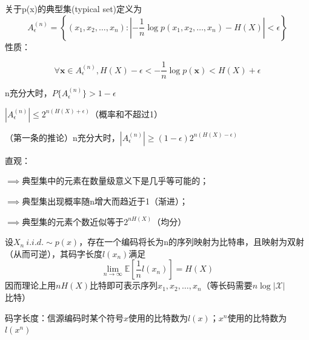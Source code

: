 \documentclass{ctexbook}
\begin{document}
\begin{definition}[典型集]
    关于p(x)的典型集(typical set)定义为
    \[A_{\epsilon}^{(n)} = \left\{(x_1,x_2,\ldots,x_n):\left|-\frac{1}{n} \log p(x_1,x_2,\ldots,x_n) - H(X)\right| < \epsilon\right\}\]
    性质：
    
     $$\forall \mathbf{x}\in A_{\epsilon}^{(n)},H(X)-\epsilon < -\frac{1}{n} \log p(\mathbf{x}) < H(X)+\epsilon$$

     n充分大时，$P\{A_{\epsilon}^{(n)}\} > 1-\epsilon$

     $|A_{\epsilon}^{(n)}| \leq 2^{n(H(X)+\epsilon)}$（概率和不超过1）

     （第一条的推论）n充分大时，$|A_{\epsilon}^{(n)}| \geq (1-\epsilon)2^{n(H(X)-\epsilon)}$
\end{definition}
\begin{remark}
    直观：

    $\implies$典型集中的元素在数量级意义下是几乎等可能的；

    $\implies$典型集出现概率随n增大而趋近于1（渐进）；

    $\implies$典型集的元素个数近似等于$2^{nH(X)}$（均分）
\end{remark}

设$X_n\ i.i.d.\sim p(x)$，存在一个编码将长为n的序列映射为比特串，且映射为双射（从而可逆），其码字长度$l(x_n)$满足
\[\lim_{n\to\infty}\mathbb{E} \left[ \frac{1}{n}l(x_n)\right]=H(X)\]
因而理论上用$nH(X)$比特即可表示序列$x_1,x_2,\ldots,x_n$（等长码需要$n\log |\mathcal{X}|$比特）

码字长度：信源编码时某个符号$x$使用的比特数为$l(x)$；$x^n$使用的比特数为$l(x^n)$
\end{document}
